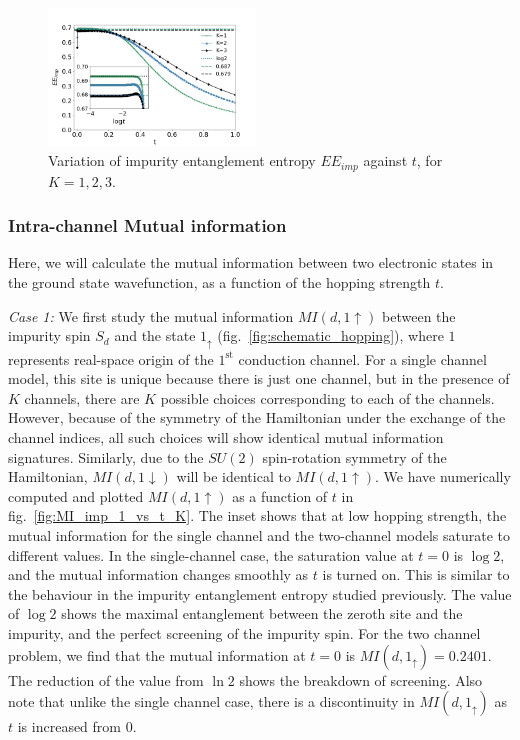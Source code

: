 \documentclass{iopart}
\begin{document}
\begin{figure}[!htpb]
\centering
\includegraphics[width=0.49\textwidth]{AI1ch123d}
\caption{Variation of impurity entanglement entropy $EE_{imp}$ against $t$, for $K=1,2,3$. }
\label{fig:EE_imp_vs_t_K}
\end{figure}

\subsubsection{Intra-channel Mutual information}
Here, we will calculate the mutual information between two electronic states in the ground state wavefunction, as a function of the hopping strength $t$. 

\par \textit{Case 1:} We first study the mutual information $MI(d,1\uparrow)$ between the impurity spin $S_d$ and the state $1_\uparrow$ (fig.~\ref{fig:schematic_hopping}), where $1$ represents real-space origin of the $1^\mathrm{st}$ conduction channel. For a single channel model, this site is unique because there is just one channel, but in the presence of $K$ channels, there are $K$ possible choices corresponding to each of the channels. However, because of the symmetry of the Hamiltonian under the exchange of the channel indices, all such choices will show identical mutual information signatures. Similarly, due to the $SU(2)$ spin-rotation symmetry of the Hamiltonian, $MI(d,1\downarrow)$ will be identical to $MI(d,1\uparrow)$. We have numerically computed and plotted $MI(d,1\uparrow)$ as a function of $t$ in fig.~\ref{fig:MI_imp_1_vs_t_K}. The inset shows that at low hopping strength, the mutual information for the single channel and the two-channel models saturate to different values. In the single-channel case, the saturation value at $t=0$ is $\log 2$, and the mutual information changes smoothly as \(t\) is turned on. This is similar to the behaviour in the impurity entanglement entropy studied previously. The value of $\log 2$ shows the maximal entanglement between the zeroth site and the impurity, and the perfect screening of the impurity spin. For the two channel problem, we find that the mutual information at \(t=0\) is $MI(d,1_{\uparrow})=0.2401$. The reduction of the value from \(\ln 2\) shows the breakdown of screening. Also note that unlike the single channel case, there is a discontinuity in $MI(d,1_{\uparrow})$ as \(t\) is increased from 0.
\end{document}
